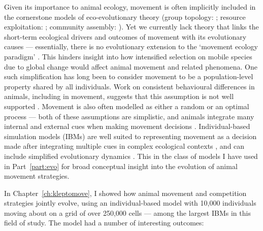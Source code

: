Given its importance to animal ecology, movement is often implicitly included in the cornerstone models of eco-evolutionary theory (group topology: \cite{hamilton1971}; resource exploitation: \cite{fretwell1970, charnov1976}; community assembly: \cite{macarthur1967}).
Yet we currently lack theory that links the short-term ecological drivers and outcomes of movement with its evolutionary causes --- essentially, there is no evolutionary extension to the `movement ecology paradigm' \citep{holyoak2008}.
This hinders insight into how intensified selection on mobile species due to global change \citep[e.g.][]{vangils2016} would affect animal movement and related phenomena.
One such simplification has long been to consider movement to be a population-level property shared by all individuals.
Work on consistent behavioural differences in animals, including in movement, suggests that this assumption is not well supported \citep{spiegel2017,shaw2020,stuber2022,webber2018,webber2020,abrahms2017}.
Movement is also often modelled as either a random or an optimal process --- both of these assumptions are simplistic, and animals integrate many internal and external cues when making movement decisions \citep{nathan2008a}.
Individual-based simulation models (IBMs) are well suited to representing movement as a decision made after integrating multiple cues in complex ecological contexts \citep{huston1988,deangelis2019}, and can include simplified evolutionary dynamics \citep{getz2015,getz2016,netz2021}.
This in the class of models I have used in Part~\ref{part:evo} for broad conceptual insight into the evolution of animal movement strategies.

In Chapter~\ref{ch:kleptomove}, I showed how animal movement and competition strategies jointly evolve, using an individual-based model with 10,000 individuals moving about on a grid of over 250,000 cells --- among the largest IBMs in this field of study.
The model had a number of interesting outcomes:

